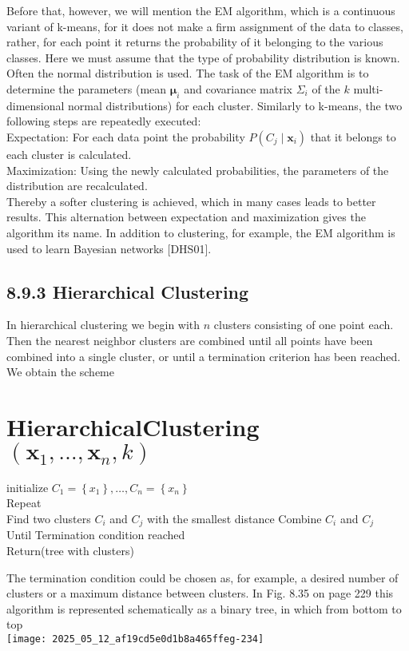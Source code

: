 \documentclass[10pt]{article}
\begin{document}
Before that, however, we will mention the EM algorithm, which is a continuous variant of k-means, for it does not make a firm assignment of the data to classes, rather, for each point it returns the probability of it belonging to the various classes. Here we must assume that the type of probability distribution is known. Often the normal distribution is used. The task of the EM algorithm is to determine the parameters (mean $\boldsymbol{\mu}_{i}$ and covariance matrix $\Sigma_{i}$ of the $k$ multi-dimensional normal distributions) for each cluster. Similarly to k-means, the two following steps are repeatedly executed:\\
Expectation: For each data point the probability $P\left(C_{j} \mid \boldsymbol{x}_{i}\right)$ that it belongs to each cluster is calculated.\\
Maximization: Using the newly calculated probabilities, the parameters of the distribution are recalculated.\\[0pt]
Thereby a softer clustering is achieved, which in many cases leads to better results. This alternation between expectation and maximization gives the algorithm its name. In addition to clustering, for example, the EM algorithm is used to learn Bayesian networks [DHS01].

\subsection*{8.9.3 Hierarchical Clustering}
In hierarchical clustering we begin with $n$ clusters consisting of one point each. Then the nearest neighbor clusters are combined until all points have been combined into a single cluster, or until a termination criterion has been reached. We obtain the scheme

\section*{HierarchicalClustering $\left(\boldsymbol{x}_{1}, \ldots, \boldsymbol{x}_{n}, k\right)$}
initialize $C_{1}=\left\{x_{1}\right\}, \ldots, C_{n}=\left\{x_{n}\right\}$\\
Repeat\\
Find two clusters $C_{i}$ and $C_{j}$ with the smallest distance Combine $C_{i}$ and $C_{j}$\\
Until Termination condition reached\\
Return(tree with clusters)

The termination condition could be chosen as, for example, a desired number of clusters or a maximum distance between clusters. In Fig. 8.35 on page 229 this algorithm is represented schematically as a binary tree, in which from bottom to top\\
\texttt{[image: 2025\_05\_12\_af19cd5e0d1b8a465ffeg-234]}
\end{document}
